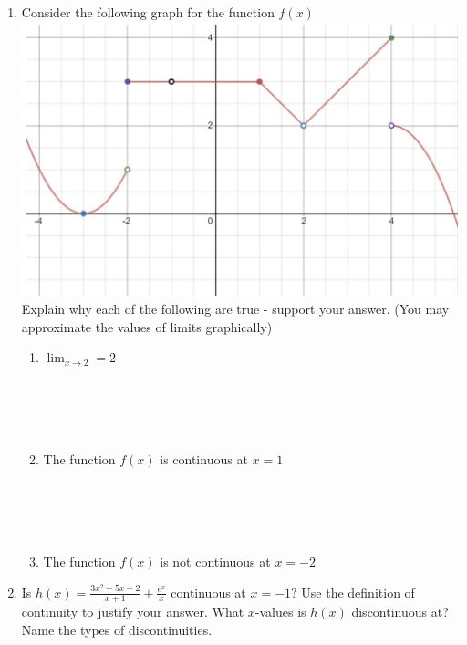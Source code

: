 \documentclass[12pt]{report}
\begin{document}
\begin{enumerate}
\item Consider the following graph for the function $f(x)$\\
\includegraphics[scale=0.5]{ctsornot.png}\\
Explain why each of the following are true - support your answer. (You may approximate the values of limits graphically)\\
\begin{enumerate}[label=\alph*.]
    \item $\lim_{x\rightarrow 2}=2$\\\\\\\\\\
    \item The function $f(x)$ is continuous at $x=1$\\\\\\\\\\
    \item The function $f(x)$ is not continuous at $x=-2$
\end{enumerate}
\newpage

    \item Is $\displaystyle h(x) = \frac{3x^2+5x+2}{x+1}+\frac{e^x}{x}$ continuous at $x =-1?$ Use the definition of continuity to justify your answer. What $x$-values is $h(x)$ discontinuous at? Name the types of discontinuities.


\end{enumerate}
\end{document}
